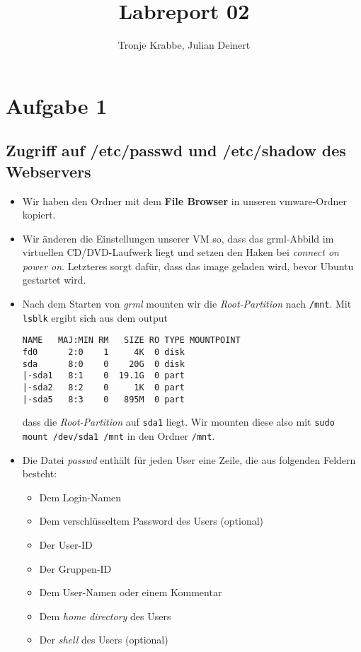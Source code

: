 \documentclass[10pt,a4paper]{article}
\author{Tronje Krabbe, Julian Deinert}
\title{Labreport 02}
\begin{document}
\maketitle
\tableofcontents
\newpage


\section*{Aufgabe 1}
\subsection{Zugriff auf /etc/passwd und /etc/shadow des Webservers}
\begin{itemize}
\item Wir haben den Ordner mit dem \textbf{File Browser} in unseren vmware-Ordner kopiert.
\item Wir änderen die Einstellungen unserer VM so, dass das grml-Abbild im virtuellen CD/DVD-Laufwerk liegt und setzen den Haken bei \textit{connect on power on}. Letzteres sorgt dafür, dass das image geladen wird, bevor Ubuntu gestartet wird.
\item Nach dem Starten von \textit{grml} mounten wir die \textit{Root-Partition} nach \texttt{/mnt}. Mit \texttt{lsblk} ergibt sich aus dem output
\begin{verbatim}
NAME   MAJ:MIN RM   SIZE RO TYPE MOUNTPOINT
fd0      2:0    1     4K  0 disk
sda      8:0    0    20G  0 disk 
|-sda1   8:1    0  19.1G  0 part 
|-sda2   8:2    0     1K  0 part 
|-sda5   8:3    0   895M  0 part

\end{verbatim}
dass die \textit{Root-Partition} auf \texttt{sda1} liegt.
Wir mounten diese also mit \texttt{sudo mount /dev/sda1 /mnt} in den Ordner \texttt{/mnt}.

\item Die Datei \textit{passwd} enthält für jeden User eine Zeile, die aus folgenden Feldern besteht:
\begin{itemize}
\item Dem Login-Namen
\item Dem verschlüsseltem Password des Users (optional)
\item Der User-ID
\item Der Gruppen-ID
\item Dem User-Namen oder einem Kommentar
\item Dem \textit{home directory} des Users
\item Der \textit{shell} des Users (optional)


\end{itemize}
\end{itemize}
\end{document}
